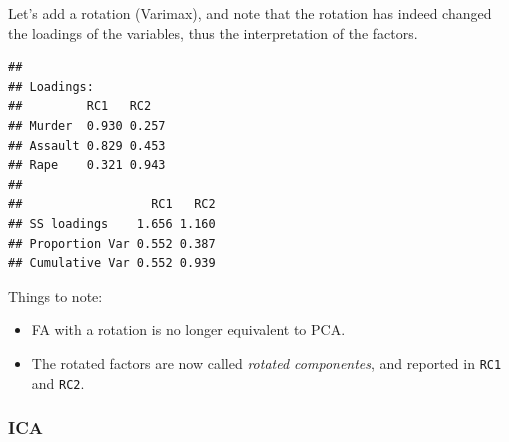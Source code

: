 \documentclass[]{book}
\newenvironment{Shaded}{\begin{snugshade}}{\end{snugshade}}
\newcommand{\KeywordTok}[1]{\textcolor[rgb]{0.13,0.29,0.53}{\textbf{#1}}}
\newcommand{\DataTypeTok}[1]{\textcolor[rgb]{0.13,0.29,0.53}{#1}}
\newcommand{\DecValTok}[1]{\textcolor[rgb]{0.00,0.00,0.81}{#1}}
\newcommand{\StringTok}[1]{\textcolor[rgb]{0.31,0.60,0.02}{#1}}
\newcommand{\OperatorTok}[1]{\textcolor[rgb]{0.81,0.36,0.00}{\textbf{#1}}}
\newcommand{\NormalTok}[1]{#1}
\providecommand{\tightlist}{%
  \setlength{\itemsep}{0pt}\setlength{\parskip}{0pt}}
\theoremstyle{definition}
\theoremstyle{definition}
\theoremstyle{definition}
\theoremstyle{remark}
\begin{document}
Let's add a rotation (Varimax), and note that the rotation has indeed
changed the loadings of the variables, thus the interpretation of the
factors.

\begin{Shaded}
\end{Shaded}

\begin{verbatim}
## 
## Loadings:
##         RC1   RC2  
## Murder  0.930 0.257
## Assault 0.829 0.453
## Rape    0.321 0.943
## 
##                  RC1   RC2
## SS loadings    1.656 1.160
## Proportion Var 0.552 0.387
## Cumulative Var 0.552 0.939
\end{verbatim}

Things to note:

\begin{itemize}
\tightlist
\item
  FA with a rotation is no longer equivalent to PCA.
\item
  The rotated factors are now called \emph{rotated componentes}, and
  reported in \texttt{RC1} and \texttt{RC2}.
\end{itemize}

\subsubsection{ICA}\label{ica}
\end{document}
